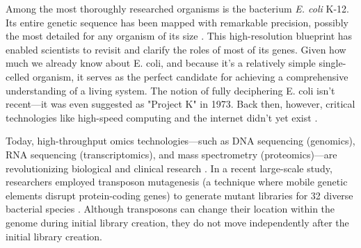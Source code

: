 \documentclass[11pt]{article}
\begin{document}
Among the most thoroughly researched organisms is the bacterium \textit{E. coli} K-12. Its entire genetic sequence has been mapped with remarkable precision, possibly the most detailed for any organism of its size \cite{riley2006escherichia}. This high-resolution blueprint has enabled scientists to revisit and clarify the roles of most of its genes. Given how much we already know about E. coli, and because it's a relatively simple single-celled organism, it serves as the perfect candidate for achieving a comprehensive understanding of a living system. The notion of fully deciphering E. coli isn't recent—it was even suggested as "Project K" in 1973. Back then, however, critical technologies like high-speed computing and the internet didn't yet exist \cite{crick1973project}. 

Today, high-throughput omics technologies—such as DNA sequencing (genomics), RNA sequencing (transcriptomics), and mass spectrometry (proteomics)—are revolutionizing biological and clinical research \cite{vitorino2024transforming}. In a recent large-scale study, researchers employed transposon mutagenesis (a technique where mobile genetic elements disrupt protein-coding genes) to generate mutant libraries for 32 diverse bacterial species \cite{price2018mutant}. Although transposons can change their location within the genome during initial library creation, they do not move independently after the initial library creation.
\end{document}
